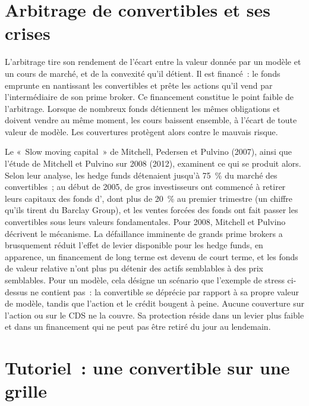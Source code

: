 \section{Arbitrage de convertibles et ses crises}

L'arbitrage tire son rendement de l'écart entre la valeur donnée par un modèle et un cours de marché, et de la convexité qu'il détient. Il est financé~:
le fonds emprunte en nantissant les convertibles et prête les actions qu'il vend par l'intermédiaire de son prime broker. Ce financement constitue le point faible de l'arbitrage. Lorsque
de nombreux fonds détiennent les mêmes obligations et doivent vendre au même moment, les cours baissent ensemble, à l'écart de toute valeur de modèle. Les couvertures protègent alors
contre le mauvais risque.

Le «~Slow moving capital~» de Mitchell, Pedersen et Pulvino (2007), ainsi que l'étude de Mitchell et Pulvino sur 2008 (2012), examinent ce qui se produit alors.
Selon leur analyse, les hedge funds détenaient jusqu'à 75~\% du marché des convertibles~; au début de 2005, de gros investisseurs ont commencé à retirer leurs capitaux
des fonds d', dont plus de 20~\% au premier trimestre (un chiffre qu'ils tirent du Barclay Group), et les ventes forcées
des fonds ont fait passer les convertibles sous leurs valeurs fondamentales. Pour 2008, Mitchell et Pulvino décrivent le mécanisme. La défaillance imminente de grands prime brokers a brusquement réduit l'effet de levier disponible pour les hedge funds,
en apparence, un financement de long terme est devenu de court terme, et les fonds de valeur relative n'ont plus pu détenir des actifs semblables à des prix semblables. Pour un modèle, cela
désigne un scénario que l'exemple de stress ci-dessus ne contient pas~: la convertible se déprécie par rapport à sa propre valeur de modèle, tandis que l'action et le crédit
bougent à peine. Aucune couverture sur l'action ou sur le CDS ne la couvre. Sa protection réside dans un levier plus faible et dans un financement qui ne peut pas être retiré du jour au lendemain.

\section{Tutoriel~: une convertible sur une grille}\label{tut:dv:convertibles-and-the-credit-equity-link:tut}

